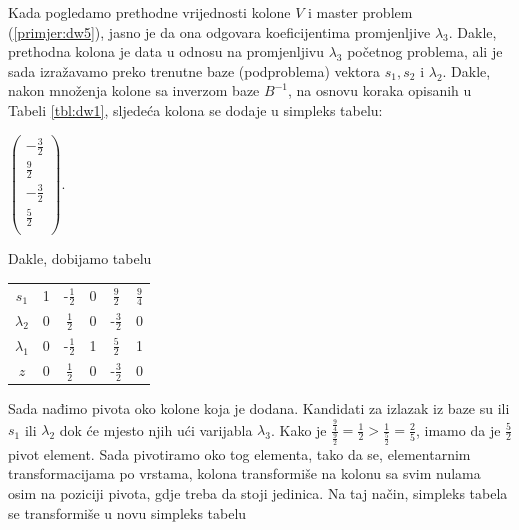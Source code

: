 \documentclass[a4paper, utf8, 11pt, colorlinks]{book}
\theoremstyle{definition}
\begin{document}
Kada pogledamo prethodne vrijednosti kolone $V$ i master problem (\ref{primjer:dw5}), jasno je da ona odgovara koeficijentima promjenljive $\lambda_3$. Dakle, prethodna kolona je data u odnosu na promjenljivu $\lambda_3$ početnog problema, ali je sada izražavamo preko trenutne baze (podproblema) vektora $s_1, s_2$ i $\lambda_2$. Dakle, nakon množenja kolone sa inverzom baze $B^{-1}$, na osnovu koraka opisanih u Tabeli \ref{tbl:dw1}, sljedeća kolona se dodaje u simpleks tabelu:

\begin{center}
 
  $\begin{pmatrix}
	 -\frac{3}{2}            \\
	 \frac{9}{2}     \\
 	-\frac{3}{2}       \\
	 \frac{5}{2}    \\
   \end{pmatrix}$.
\end{center}
Dakle, dobijamo tabelu 

\begin{center}
 
		\begin{tabular}{c|cccc|c}\vspace{1mm}
		   $s_1$	    &   1      &   -$\frac{1}{2}$         &   0         &   $\frac{9}{2}$          &  $\frac{9}{4}$ \\\vspace{1mm}
		   $\lambda_2$  &   0      &    $\frac{1}{2}$         &   0         &  -$ \frac{3}{2}$         &  0             \\\vspace{1mm}
		   $\lambda_1$  &   0      &    -$\frac{1}{2}$        &   1         &  $\frac{5}{2} $          &  1             \\ \hline\vspace{1mm}
		   $z$          &   0      &    $\frac{1}{2}$         &   0         &   -$\frac{3}{2}$       & 0  
	\end{tabular}
 
\end{center} 
Sada nađimo pivota oko kolone koja je dodana. Kandidati za izlazak iz baze su ili $s_1$ ili $\lambda_2$ dok će mjesto njih ući varijabla $\lambda_3$. Kako je $\frac{\frac94}{\frac92}=\frac{1}{2} > \frac{1}{\frac52}=\frac{2}{5}$, imamo da je $\frac{5}{2}$ pivot element. Sada pivotiramo oko tog elementa, tako da se, elementarnim transformacijama po vrstama, kolona transformiše  na kolonu sa svim nulama osim na poziciji pivota, gdje treba da stoji jedinica. Na taj način, simpleks tabela se transformiše u novu simpleks tabelu 
\end{document}

